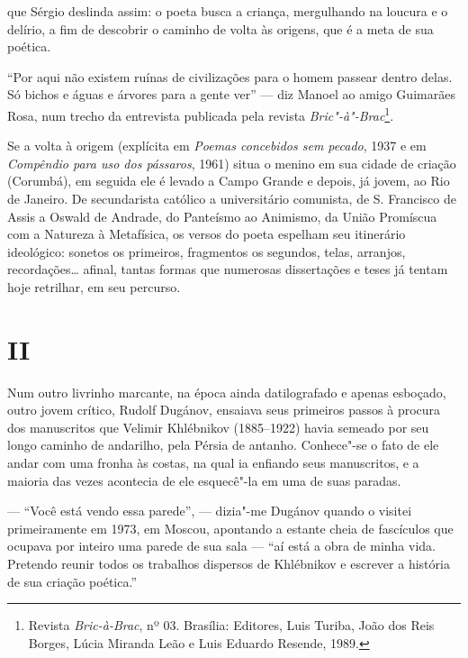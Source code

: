 {que Sérgio deslinda assim: o poeta busca a criança, mergulhando na
loucura e o delírio, a fim de descobrir o caminho de volta às origens,
que é a meta de sua poética.

``Por aqui não existem ruínas de civilizações para o homem passear
dentro delas. Só bichos e águas e árvores para a gente ver'' --- diz
Manoel ao amigo Guimarães Rosa, num trecho da entrevista publicada pela
revista \emph{Bric"-à"-Brac}\footnote{Revista \emph{Bric-à-Brac}, nº 03. Brasília: Editores,
Luis Turiba, João dos Reis Borges, Lúcia Miranda Leão e Luis Eduardo Resende, 1989.}.

Se a volta à origem (explícita em \emph{Poemas concebidos sem pecado}, 1937 e em \emph{Compêndio para uso dos pássaros}, 1961) situa o menino
em sua cidade de criação (Corumbá), em seguida ele é levado a Campo
Grande e depois, já jovem, ao Rio de Janeiro. De secundarista católico a
universitário comunista, de S. Francisco de Assis a Oswald de Andrade,
do Panteísmo ao Animismo, da União Promíscua com a Natureza à
Metafísica, os versos do poeta espelham seu itinerário ideológico:
sonetos os primeiros, fragmentos os segundos, telas, arranjos,
recordações\ldots{} afinal, tantas formas que numerosas dissertações e teses
já tentam hoje retrilhar, em seu percurso.

\section{II}

Num outro livrinho marcante, na época ainda datilografado e apenas
esboçado, outro jovem crítico, Rudolf Dugánov, ensaiava seus primeiros
passos à procura dos manuscritos que Velimir Khlébnikov (1885--1922)
havia semeado por seu longo caminho de andarilho, pela Pérsia de
antanho. Conhece"-se o fato de ele andar com uma fronha às costas, na
qual ia enfiando seus manuscritos, e a maioria das vezes acontecia de
ele esquecê"-la em uma de suas paradas.

--- ``Você está vendo essa parede'', --- dizia"-me Dugánov quando o visitei
primeiramente em 1973, em Moscou, apontando a estante cheia de fascículos que
ocupava por inteiro uma parede de sua sala --- ``aí está a obra
de minha vida. Pretendo reunir todos os trabalhos dispersos de Khlébnikov
e escrever a história de sua criação poética.''

}
